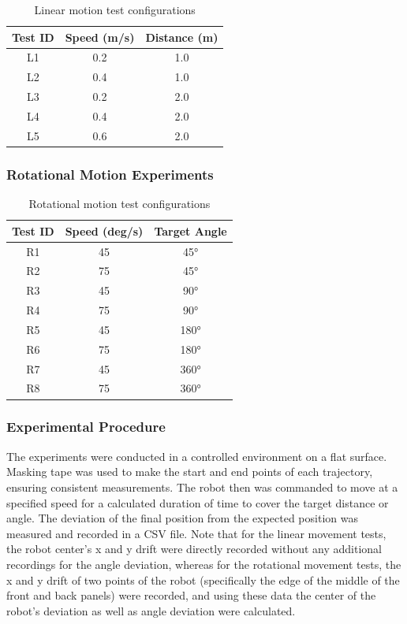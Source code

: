 \documentclass[a4paper, 12pt]{article}
\begin{document}
    \begin{table}[H]
    \centering
    \begin{tabular}{|c|c|c|}
    \hline
    \textbf{Test ID} & \textbf{Speed (m/s)} & \textbf{Distance (m)} \\
    \hline
    L1 & 0.2 & 1.0 \\
    L2 & 0.4 & 1.0 \\
    L3 & 0.2 & 2.0 \\
    L4 & 0.4 & 2.0 \\
    L5 & 0.6 & 2.0 \\
    \hline
    \end{tabular}
    \caption{Linear motion test configurations}
    \end{table}

    \subsubsection*{Rotational Motion Experiments}

    \begin{table}[H]
    \centering
    \begin{tabular}{|c|c|c|}
    \hline
    \textbf{Test ID} & \textbf{Speed (deg/s)} & \textbf{Target Angle} \\
    \hline
    R1 & 45 & 45° \\
    R2 & 75 & 45° \\
    R3 & 45 & 90° \\
    R4 & 75 & 90° \\
    R5 & 45 & 180° \\
    R6 & 75 & 180° \\
    R7 & 45 & 360° \\
    R8 & 75 & 360° \\
    \hline
    \end{tabular}
    \caption{Rotational motion test configurations}
    \end{table}

    \subsubsection{Experimental Procedure}

    The experiments were conducted in a controlled environment on a flat surface. Masking tape was used to make the start and end points of each trajectory, ensuring consistent measurements. The robot then was commanded to move at a specified speed for a calculated duration of time to cover the target distance or angle. The deviation of the final position from the expected position was measured and recorded in a CSV file. Note that for the linear movement tests, the robot center's x and y drift were directly recorded without any additional recordings for the angle deviation, whereas for the rotational movement tests, the x and y drift of two points of the robot (specifically the edge of the middle of the front and back panels) were recorded, and using these data the center of the robot's deviation as well as angle deviation were calculated. 
\end{document}

